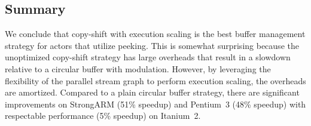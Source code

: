\subsection{Summary}

We conclude that copy-shift with execution scaling is the best buffer
management strategy for actors that utilize peeking.  This is
somewhat surprising because the unoptimized copy-shift strategy has
large overheads that result in a slowdown relative to a circular
buffer with modulation.  However, by leveraging the flexibility of the
parallel stream graph to perform execution scaling, the overheads are
amortized.  Compared to a plain circular buffer strategy, there are
significant improvements on StrongARM (51\% speedup) and Pentium~3
(48\% speedup) with respectable performance (5\% speedup) on
Itanium~2.





